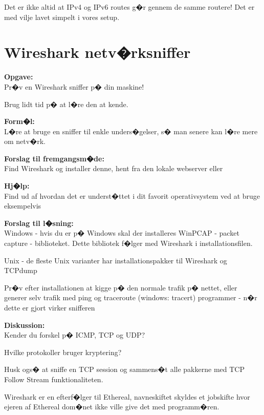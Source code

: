 \documentclass[a4paper,11pt,notitlepage]{oevelser}
\begin{document}
Det er ikke altid at IPv4 og IPv6 routes g�r gennem de samme routere! Det er med vilje lavet simpelt i vores setup.



\chapter{Wireshark netv�rksniffer}
\label{ex:wireshark}


{\bfseries Opgave:}\\
Pr�v en Wireshark sniffer p� din maskine!

Brug lidt tid p� at l�re den at kende.

{\bfseries Form�l:}\\
L�re at bruge en sniffer til enkle unders�gelser, s� man senere kan l�re mere om netv�rk.

{\bfseries Forslag til fremgangsm�de:}\\
Find Wireshark og installer denne, hent fra den lokale webserver eller 

{\bfseries Hj�lp:}\\
Find ud af hvordan det er underst�ttet i dit favorit operativsystem
ved at bruge eksempelvis 

{\bfseries Forslag til l�sning:}\\
Windows - hvis du er p� Windows skal der
installeres WinPCAP - packet capture - biblioteket. Dette bibliotek f�lger med
Wireshark i installationsfilen.


Unix - de fleste Unix varianter har installationspakker til Wireshark
og TCPdump

Pr�v efter installationen at kigge p� den normale trafik p� nettet,
eller generer selv trafik med ping og traceroute (windows: tracert)
programmer
- n�r dette er gjort virker snifferen

{\bfseries Diskussion:}\\
Kender du forskel p� ICMP, TCP og UDP?

Hvilke protokoller bruger kryptering?

Husk ogs� at sniffe en TCP session og sammens�t alle pakkerne med
TCP Follow Stream funktionaliteten.

Wireshark er en efterf�lger til Ethereal, navneskiftet skyldes et jobskifte hvor ejeren af Ethereal dom�net ikke ville give det med programm�ren.
\end{document}
